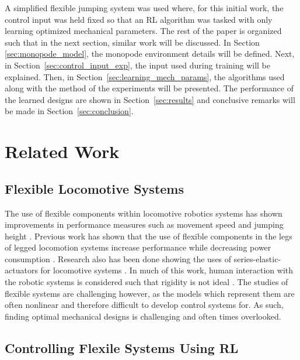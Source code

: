 \documentclass[10pt,twocolumn,letterpaper]{article}
\begin{document}
A simplified flexible jumping system was used where, for this initial work, the control input was held fixed so that an RL algorithm was tasked with only learning optimized mechanical parameters. The rest of the paper is organized such that in the next section, similar work will be discussed. In Section \ref{sec:monopode_model}, the monopode environment details will be defined. Next, in Section~\ref{sec:control_input_exp}, the input used during training will be explained. Then, in Section~\ref{sec:learning_mech_params}, the algorithms used along with the method of the experiments will be presented. The performance of the learned designs are shown in Section~\ref{sec:results} and conclusive remarks will be made in Section~\ref*{sec:conclusion}.


\section{Related Work}
\label{sec:related_work}
\subsection{Flexible Locomotive Systems}

The use of flexible components within locomotive robotics systems has shown improvements in performance measures such as movement speed and jumping height \cite{Sugiyama2004, Hurst2008}. Previous work has shown that the use of flexible components in the legs of legged locomotion systems increase performance while decreasing power consumption \cite{Saranli2001}. Research also has been done showing the uses of series-elastic-actuators for locomotive systems \cite{Pratt1995}. In much of this work, human interaction with the robotic systems is considered such that rigidity is not ideal \cite{Zhang2019}. The studies of flexible systems are challenging however, as the models which represent them are often nonlinear and therefore difficult to develop control systems for. As such, finding optimal mechanical designs is challenging and often times overlooked. 

\subsection{Controlling Flexile Systems Using RL}
\end{document}
